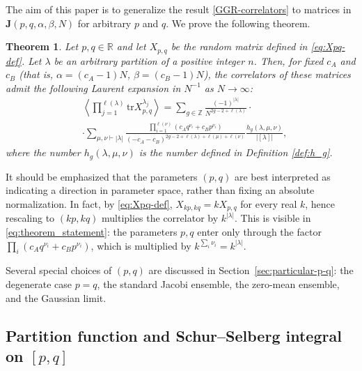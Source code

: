 \documentclass{article}
\newcommand{\tr}{\mathrm{tr}}
\theoremstyle{plain}
\newtheorem{thm}{Theorem}[section]
\theoremstyle{definition}
\numberwithin{equation}{section}
\begin{document}
The aim of this paper is to generalize the result \eqref{GGR-correlators} to matrices in $\mathbf{J}(p,q,\alpha,\beta, N)$ for arbitrary $p$ and $q$. We prove the following theorem.

\begin{thm}
    \label{thm:main-theorem}
    Let $p,q\in\mathbb R$ and let $X_{p,q}$ be the random matrix defined in \eqref{eq:Xpq-def}. Let $\lambda$ be an arbitrary partition of a positive integer $n$. Then, for fixed $c_A$ and $c_B$ (that is, $\alpha=(c_A-1)N$, $\beta=(c_B-1)N$), the correlators of these matrices admit the following Laurent expansion in $N^{-1}$ as $N\to\infty$:
    \begin{equation}
        \label{eq:theorem_statement}
        \begin{aligned}
            & \left<\prod_{j=1}^{\ell(\lambda)}\tr X_{p,q}^{\lambda_{j}}\right> = \sum\limits_{g \in \mathbb{Z}} \frac{(-1)^{|\lambda|}}{N^{2g-2+ \ell(\lambda)}}\cdot\\
            & \cdot \sum\limits_{\mu, \nu \vdash |\lambda|} \frac{\prod_{i=1}^{\ell(\nu)}\left( c_A q^{\nu_{i}} + c_B p^{\nu_{i}} \right)}{(-c_{A} - c_{B})^{2g-2 + \ell(\lambda) + \ell(\mu) + \ell(\nu)}} \frac{h_{g}(\lambda, \mu, \nu)}{|[\lambda]|}, 
        \end{aligned}
    \end{equation}
    where the number $h_g(\lambda, \mu, \nu)$ is the number defined in Definition \ref{def:h_g}.
\end{thm}

It should be emphasized that the parameters $(p,q)$ are best interpreted as indicating a direction in parameter space, rather than fixing an absolute normalization. In fact, by \eqref{eq:Xpq-def}, $X_{kp,kq}=kX_{p,q}$ for every real $k$, hence rescaling to $(kp,kq)$ multiplies the correlator by $k^{|\lambda|}$. This is visible in \eqref{eq:theorem_statement}: the parameters $p,q$ enter only through the factor $\prod_{i}(c_Aq^{\nu_i}+c_Bp^{\nu_i})$, which is multiplied by $k^{\sum_i\nu_i}=k^{|\lambda|}$.

Several special choices of $(p,q)$ are discussed in
Section~\ref{sec:particular-p-q}: the degenerate case $p=q$, the standard
Jacobi ensemble, the zero-mean ensemble, and the Gaussian limit.

\subsection{Partition function and Schur–Selberg integral on $[p,q]$}
\end{document}
